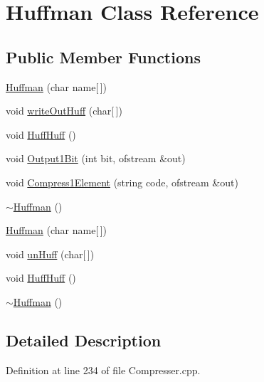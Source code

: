\hypertarget{class_huffman}{\section{\-Huffman \-Class \-Reference}
\label{class_huffman}
}
\subsection*{\-Public \-Member \-Functions}
\begin{DoxyCompactItemize}
\item 
\hyperlink{class_huffman_ad98b019593e6ec581c7e5dc3e1633eb3}{\-Huffman} (char name\mbox{[}$\,$\mbox{]})
\item 
void \hyperlink{class_huffman_af809e2ab2f7c117da226c0b7afc60d05}{write\-Out\-Huff} (char\mbox{[}$\,$\mbox{]})
\item 
void \hyperlink{class_huffman_ab10f923751e0c2a0843ac09c3afe3a15}{\-Huff\-Huff} ()
\item 
void \hyperlink{class_huffman_a20fe01753531c5dab1a53d8746a7b056}{\-Output1\-Bit} (int bit, ofstream \&out)
\item 
void \hyperlink{class_huffman_a10bfdd88f34ee9c94c56e71b46a8eb95}{\-Compress1\-Element} (string code, ofstream \&out)
\item 
\hyperlink{class_huffman_a641376a7cb5871a6a2c7b51afb05bfcc}{$\sim$\-Huffman} ()
\item 
\hyperlink{class_huffman_ad98b019593e6ec581c7e5dc3e1633eb3}{\-Huffman} (char name\mbox{[}$\,$\mbox{]})
\item 
void \hyperlink{class_huffman_a9606b9a05681d8d6d461142508040a9a}{un\-Huff} (char\mbox{[}$\,$\mbox{]})
\item 
void \hyperlink{class_huffman_ab10f923751e0c2a0843ac09c3afe3a15}{\-Huff\-Huff} ()
\item 
\hyperlink{class_huffman_a641376a7cb5871a6a2c7b51afb05bfcc}{$\sim$\-Huffman} ()
\end{DoxyCompactItemize}


\subsection{\-Detailed \-Description}


\-Definition at line 234 of file \-Compresser.\-cpp.



